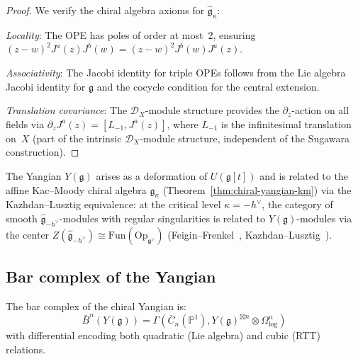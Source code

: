 \begin{proof}
We verify the chiral algebra axioms for $\hat{\mathfrak{g}}_\kappa$:

\emph{Locality}: The OPE has poles of order at most~2, ensuring $(z-w)^2 J^a(z)J^b(w) = (z-w)^2 J^b(w)J^a(z)$.

\emph{Associativity}: The Jacobi identity for triple OPEs follows from the Lie algebra Jacobi identity for $\mathfrak{g}$ and the cocycle condition for the central extension.

\emph{Translation covariance}: The $\mathcal{D}_X$-module structure provides the $\partial_z$-action on all fields via $\partial_z J^a(z) = [L_{-1}, J^a(z)]$, where $L_{-1}$ is the infinitesimal translation on~$X$ (part of the intrinsic $\mathcal{D}_X$-module structure, independent of the Sugawara construction). \qedhere
\end{proof}

\begin{theorem}
\label{thm:chiral-yangian}
The Yangian $Y(\mathfrak{g})$ arises as a deformation of $U(\mathfrak{g}[t])$ and is related to the affine Kac--Moody chiral algebra $\hat{\mathfrak{g}}_\kappa$ (Theorem~\ref{thm:chiral-yangian-km}) via the Kazhdan--Lusztig equivalence: at the critical level $\kappa = -h^\vee$, the category of smooth $\hat{\mathfrak{g}}_{-h^\vee}$-modules with regular singularities is related to $Y(\mathfrak{g})$-modules via the center $Z(\hat{\mathfrak{g}}_{-h^\vee}) \cong \mathrm{Fun}(\mathrm{Op}_{\mathfrak{g}^\vee})$ (Feigin--Frenkel~\cite{Feigin-Frenkel}, Kazhdan--Lusztig~\cite{KL93}).
\end{theorem}

\subsection{Bar complex of the Yangian}

\begin{theorem}
\label{thm:yangian-bar-complex-structure}
The bar complex of the chiral Yangian is:
\[
\bar{B}^n(Y(\mathfrak{g})) = \Gamma\left(\overline{C}_n(\mathbb{P}^1), Y(\mathfrak{g})^{\boxtimes n} \otimes \Omega^n_{\log}\right)
\]
with differential encoding both quadratic (Lie algebra) and cubic (RTT) relations.
\end{theorem}

